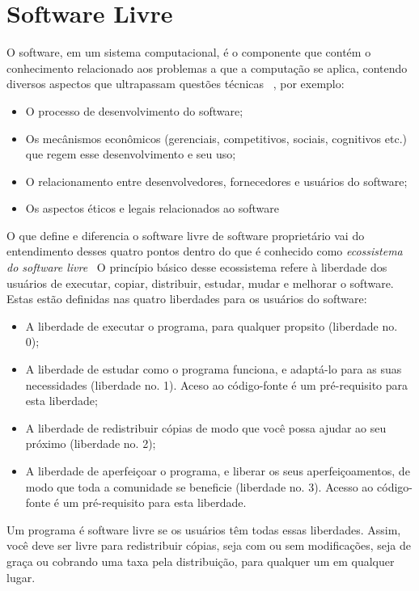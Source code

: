 \chapter{Software Livre}
\label{cap-software-livre}

%
O software, em um sistema computacional, é o componente que contém o conhecimento relacionado aos problemas a que a computação se aplica, contendo diversos aspectos que ultrapassam questões técnicas~\cite{}%
, por exemplo:
\begin{itemize}
\item O processo de desenvolvimento do software;
\item Os mecânismos econômicos (gerenciais, competitivos, sociais, cognitivos etc.) que regem esse desenvolvimento e seu uso;
\item O relacionamento entre desenvolvedores, fornecedores e usuários do software;
\item Os aspectos éticos e legais relacionados ao software
\end{itemize} 

O que define e diferencia o software livre de software proprietário vai do entendimento desses quatro pontos dentro do que é conhecido como \textit{ecossistema do software livre}~\cite{}%
O princípio básico desse ecossistema refere à liberdade dos usuários de executar, copiar, distribuir, estudar, mudar e melhorar o software. Estas estão definidas nas quatro liberdades para os usuários do software:

\begin{itemize}
\item A liberdade de executar o programa, para qualquer propsito (liberdade no. 0);
\item A liberdade de estudar como o programa funciona, e adaptá-lo para as suas necessidades (liberdade no. 1). Aceso ao código-fonte é um pré-requisito para esta liberdade;
\item A liberdade de redistribuir cópias de modo que você possa ajudar ao seu próximo (liberdade no. 2);
\item A liberdade de aperfeiçoar o programa, e liberar os seus aperfeiçoamentos, de modo que toda a comunidade se beneficie (liberdade no. 3). Acesso ao código-fonte é um pré-requisito para esta liberdade.
\end{itemize}

Um programa é software livre se os usuários têm todas essas liberdades. Assim, você deve ser livre para redistribuir cópias, seja com ou sem modificações, seja de graça ou cobrando uma taxa pela distribuição, para qualquer um em qualquer lugar.

